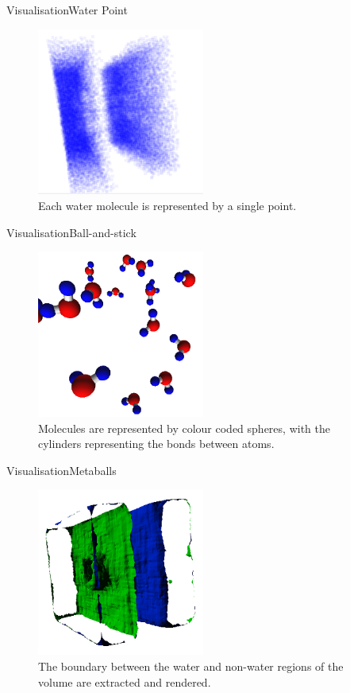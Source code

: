 \documentclass{beamer}
\begin{document}
\begin{frame}{Visualisation}{Water Point}
\begin{figure}
  \centering
  \includegraphics[width=55mm]{min-images/water-point.png}
  \caption{Each water molecule is represented by a single point.}
\end{figure}
\end{frame}

\begin{frame}{Visualisation}{Ball-and-stick}
\begin{figure}
  \centering
  \includegraphics[width=55mm]{min-images/ball-and-stick.png}
  \caption{Molecules are represented by colour coded spheres, with the cylinders representing the bonds between atoms.}
\end{figure}
\end{frame}

\begin{frame}{Visualisation}{Metaballs}
\begin{figure}
  \centering
  \includegraphics[width=55mm]{min-images/metaballs.png}
  \caption{The boundary between the water and non-water regions of the volume are extracted and rendered.}
\end{figure}
\end{frame}
\end{document}
